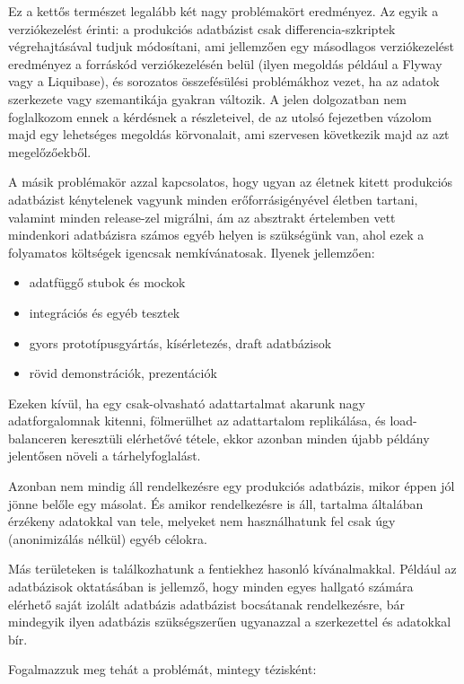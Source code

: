 \documentclass[
    parspace,
    noindent,
    nohyp,
]{elteiktdk}[2023/04/10]
\begin{document}
Ez a kettős természet legalább két nagy problémakört eredményez.
Az egyik a verziókezelést érinti:
a produkciós adatbázist csak differencia-szkriptek végrehajtásával tudjuk módosítani,
ami jellemzően egy másodlagos verziókezelést eredményez a forráskód verziókezelésén belül
(ilyen megoldás például a Flyway vagy a Liquibase),
és sorozatos összefésülési problémákhoz vezet, ha az adatok szerkezete vagy szemantikája gyakran változik.
A jelen dolgozatban nem foglalkozom ennek a kérdésnek a részleteivel,
de az utolsó fejezetben vázolom majd egy lehetséges megoldás körvonalait,
ami szervesen következik majd az azt megelőzőekből.

A másik problémakör azzal kapcsolatos, hogy ugyan az életnek kitett produkciós adatbázist
kénytelenek vagyunk minden erőforrásigényével életben tartani, valamint minden release-zel migrálni,
ám az absztrakt értelemben vett mindenkori adatbázisra számos egyéb helyen is szükségünk van,
ahol ezek a folyamatos költségek igencsak nemkívánatosak.
Ilyenek jellemzően:

\begin{itemize}
    \item adatfüggő stubok és mockok
    \item integrációs és egyéb tesztek
    \item gyors prototípusgyártás, kísérletezés, draft adatbázisok
    \item rövid demonstrációk, prezentációk
\end{itemize}

Ezeken kívül, ha egy csak-olvasható adattartalmat akarunk nagy adatforgalomnak kitenni,
fölmerülhet az adattartalom replikálása, és load-balanceren keresztüli elérhetővé tétele,
ekkor azonban minden újabb példány jelentősen növeli a tárhelyfoglalást.

Azonban nem mindig áll rendelkezésre egy produkciós adatbázis,
mikor éppen jól jönne belőle egy másolat.
És amikor rendelkezésre is áll, tartalma általában érzékeny adatokkal van tele,
melyeket nem használhatunk fel csak úgy (anonimizálás nélkül) egyéb célokra.

Más területeken is találkozhatunk a fentiekhez hasonló kívánalmakkal.
Például az adatbázisok oktatásában is jellemző, hogy minden egyes hallgató
számára elérhető saját izolált adatbázis adatbázist bocsátanak rendelkezésre,
bár mindegyik ilyen adatbázis szükségszerűen ugyanazzal a szerkezettel és adatokkal bír.

Fogalmazzuk meg tehát a problémát, mintegy tézisként:
\end{document}
